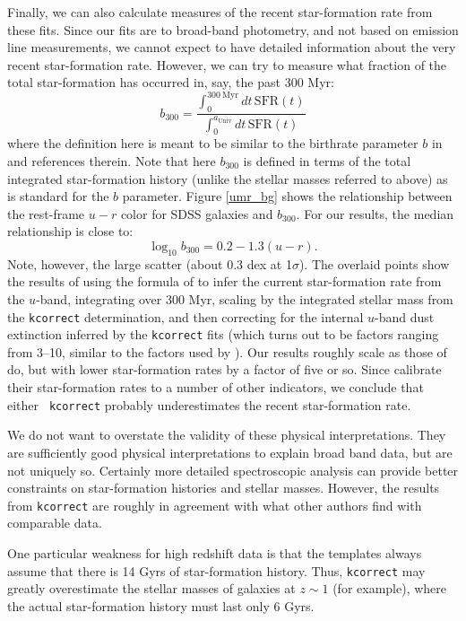 \documentclass[10pt,preprint]{aastex}
\begin{document}
Finally, we can also calculate measures of the recent star-formation
rate from these fits. Since our fits are to broad-band photometry, and
not based on emission line measurements, we cannot expect to have
detailed information about the very recent star-formation
rate. However, we can try to measure what fraction of the total
star-formation has occurred in, say, the past 300 Myr:
\begin{equation}
b_{300} = \frac{\int_0^{300\mathrm{~Myr}} dt\, \mathrm{SFR}(t)}
{\int_0^{a_{\mathrm{Univ}}} dt\, \mathrm{SFR}(t)}
\end{equation}
where the definition here is meant to be similar to the birthrate
parameter $b$ in \citet{kennicutt94a} and references therein.  Note
that here $b_{300}$ is defined in terms of the total integrated
star-formation history (unlike the stellar masses referred to above)
as is standard for the $b$ parameter. Figure \ref{umr_bg} shows the
relationship between the rest-frame $u-r$ color for SDSS galaxies and
$b_{300}$. For our results, the median relationship is close to:
\begin{equation}
\log_{10} b_{300} = 0.2 - 1.3 (u-r). 
\end{equation}
Note, however, the large scatter (about 0.3 dex at 1$\sigma$).  The
overlaid points show the results of using the formula of \citet{hopkins03a}
to infer the current star-formation rate from the $u$-band,
integrating over 300 Myr, scaling by the integrated stellar mass from
the {\tt kcorrect} determination, and then correcting for the internal
$u$-band dust extinction inferred by the {\tt kcorrect} fits (which
turns out to be factors ranging from 3--10, similar to the factors
used by \citealt{hopkins03a}).  Our results roughly scale as those of
\citet{hopkins03a} do, but with lower star-formation rates by a factor
of five or so. Since \citet{hopkins03a} calibrate their star-formation
rates to a number of other indicators, we conclude that either {\tt
kcorrect} probably underestimates the recent star-formation rate.

We do not want to overstate the validity of these physical
interpretations. They are sufficiently good physical interpretations
to explain broad band data, but are not uniquely so. Certainly more
detailed spectroscopic analysis can provide better constraints on
star-formation histories and stellar masses.  However, the results
from {\tt kcorrect} are roughly in agreement with what other authors
find with comparable data.

One particular weakness for high redshift data is that the templates
always assume that there is 14 Gyrs of star-formation history.  Thus,
{\tt kcorrect} may greatly overestimate the stellar masses of galaxies
at $z \sim 1$ (for example), where the actual star-formation history
must last only 6 Gyrs.
\end{document}

